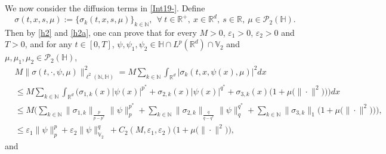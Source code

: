 \documentclass[11pt]{article}
\renewcommand{\leq}{\leqslant}
\numberwithin{equation}{section}
\begin{document}
We now consider the diffusion terms in \eqref{Int19-}. Define $$\sigma(t,x,s,\mu):=\{\sigma_{k}(t,x, s,\mu)
\}_{k\in\mathbb{N}},\ \ \forall\ t\in\mathbb{R}^+, \ x\in\mathbb{R}^d,\ s\in\mathbb{R},\ \mu
\in\mathcal{P}_2(\mathbb{H}).$$
Then by \eqref{h2} and \eqref{h2a}, one can prove that
for every $M>0$, $\varepsilon_1>0$, $\varepsilon_2>0$ and $T>0$, and  for
any $t\in[0,T]$, $\psi,\psi_1,\psi_2\in
\mathbb{H}\cap L^p(\mathbb{R}^d)\cap \mathbb{V}_2$ and $\mu,\mu_1,\mu_2
\in\mathcal{P}_2(\mathbb{H})$,
\begin{align}\label{h2-}
&M\|\sigma(t,\cdot,\psi,\mu)\|^2_{
\ell^2(\mathbb{N},
\mathbb{H})}
=M\sum_{k\in\mathbb{N}}\int_{\mathbb{R}^d}
|\sigma_k(t,x,\psi(x),\mu)|^2dx
\nonumber\\
&\leq
M\sum_{k\in\mathbb{N}}\int_{\mathbb{R}^d}
\Big(
\sigma_{1,k}(x)
|\psi(x)|^{p^*}+
\sigma_{2,k}(x)
|\psi(x)|^{q^*}
 +
\sigma_{3,k}(x)
\big(1+\mu\big(\|\cdot\|^2\big)\big)\Big)dx
\nonumber\\
&\leq
 M
 \Bigg(
 \sum_{k\in\mathbb{N}}\|\sigma_{1,k} \|
 _{\frac p{p-p^*}}
 \| \psi\|^{p^*}_{p}
 +
 \sum_{k\in\mathbb{N}}\|\sigma_{2,k}\|
 _{\frac q{q-q^*} }
  \| \psi\|^{q^*}_{q}
 +
 \sum_{k\in\mathbb{N}}\|\sigma_{3,k}\|
 _{1}\big(1+\mu\big(\|\cdot\|^2
\big)\big)\Bigg),
\nonumber\\
&\le
\varepsilon_1
\|\psi\|_p^{p}+\varepsilon_2
\|\psi\|_{\mathbb{V}_2}^{q}\
+C_2(M,\varepsilon_1,\varepsilon_2)
\big(1+\mu\big(\|\cdot\|^2
\big)\big),
\end{align}
and
\end{document}
